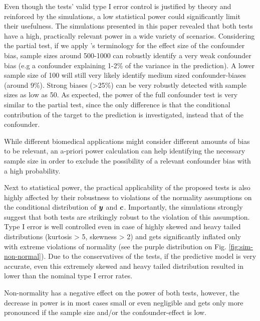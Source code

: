 \documentclass{article}
\begin{document}
Even though the tests' valid type I error control is justified by theory and reinforced by the simulations, a low statistical power could significantly limit their usefulness. The simulations presented in this paper revealed that both tests have a high, practically relevant power in a wide variety of scenarios. Considering the partial test, if we apply \citeauthor{cohen2013statistical}'s terminology for the effect size of the confounder bias, sample sizes around 500-1000 can robustly identify a very weak confounder bias (e.g a confounder explaining 1-2\% of the variance in the prediction). A lower sample size of 100 will still very likely identify medium sized confounder-biases (around 9\%). Strong biases  (>25\%) can be very robustly detected with sample sizes as low as 50. 
As expected, the power of the full confounder test is very similar to the partial test, since the only difference is that the conditional contribution of the target to the prediction is investigated, instead that of the confounder.

While different biomedical applications might consider different amounts of bias to be relevant, an a-priori power calculation can help identifying the necessary sample size in order to exclude the possibility of a relevant confounder bias with a high probability.

Next to statistical power, the practical applicability of the proposed tests is also highly affected by their robustness to violations of the normality assumptions on the conditional distribution of $\boldsymbol{y}$ and $\boldsymbol{c}$. Importantly, the simulations strongly suggest that both tests are strikingly robust to the violation of this assumption. Type I error is well controlled even in case of highly skewed and heavy tailed distributions (kurtosis > 5, skewness > 2) and gets significantly inflated only with extreme violations of normality (see the purple distribution on Fig. \ref{fig:sim-non-normal}). Due to the conservatives of the tests, if the predictive model is very accurate, even this extremely skewed and heavy tailed distribution resulted in lower than the nominal type I error rates.

Non-normality has a negative effect on the power of both tests, however, the decrease in power is in most cases small or even negligible and gets only more pronounced if the sample size and/or the confounder-effect is low.
\end{document}
